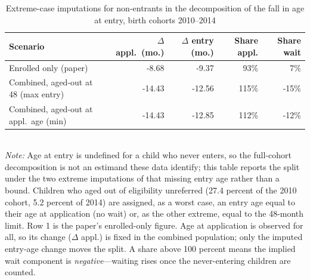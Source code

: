 \begin{table}[htbp]\centering
\caption{Extreme-case imputations for non-entrants in the decomposition of the fall in age at entry, birth cohorts 2010--2014}
\label{tab:E5}
\footnotesize
\setlength{\tabcolsep}{4pt}
\begin{tabular}{lrrrr}
\toprule
Scenario & $\Delta$ appl.\ (mo.) & $\Delta$ entry (mo.) & Share appl. & Share wait \\
\midrule
Enrolled only (paper) & -8.68 & -9.37 & 93\% & 7\% \\
Combined, aged-out at 48 (max entry) & -14.43 & -12.56 & 115\% & -15\% \\
Combined, aged-out at appl.\ age (min) & -14.43 & -12.85 & 112\% & -12\% \\
\bottomrule
\end{tabular}
\\[3pt]{\footnotesize \textit{Note:} Age at entry is undefined for a child who never enters, so the full-cohort decomposition is not an estimand these data identify; this table reports the split under the two extreme imputations of that missing entry age rather than a bound. Children who aged out of eligibility unreferred (27.4 percent of the 2010 cohort, 5.2 percent of 2014) are assigned, as a worst case, an entry age equal to their age at application (no wait) or, as the other extreme, equal to the 48-month limit. Row 1 is the paper's enrolled-only figure. Age at application is observed for all, so its change ($\Delta$ appl.) is fixed in the combined population; only the imputed entry-age change moves the split. A share above 100 percent means the implied wait component is \emph{negative}---waiting rises once the never-entering children are counted.}
\end{table}
